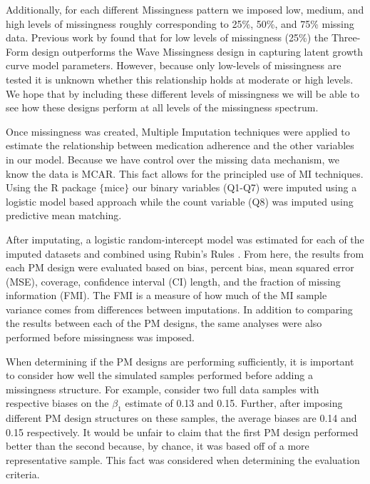 \documentclass{svjour3}\usepackage[]{graphicx}\usepackage[]{color}
\begin{document}
Additionally, for each different Missingness pattern we imposed low, medium, and high levels of missingness roughly corresponding to 25\%, 50\%, and 75\% missing data. Previous work by \citet{rhemtulla2014planned} found that for low levels of missingness (25\%) the Three-Form design outperforms the Wave Missingness design in capturing latent growth curve model parameters. However, because only low-levels of missingness are tested it is unknown whether this relationship holds at moderate or high levels. We hope that by including these different levels of missingness we will be able to see how these designs perform at all levels of the missingness spectrum. \par
Once missingness was created, Multiple Imputation techniques were applied to estimate the relationship between medication adherence and the other variables in our model. Because we have control over the missing data mechanism, we know the data is MCAR. This fact allows for the principled use of MI techniques. Using the R package $\{$mice$\}$ \citep{mice2011imputation} our binary variables (Q1-Q7) were imputed using a logistic model based approach while the count variable (Q8) was imputed using predictive mean matching. \par

After imputating, a logistic random-intercept model was estimated for each of the imputed datasets and combined using Rubin's Rules \citep{rubin2004multiple}. From here, the results from each PM design were evaluated based on bias, percent bias, mean squared error (MSE), coverage, confidence interval (CI) length, and the fraction of missing information (FMI). The FMI is a measure of how much of the MI sample variance comes from differences between imputations. In addition to comparing the results between each of the PM designs, the same analyses were also performed before missingness was imposed. \par

When determining if the PM designs are performing sufficiently, it is important to consider how well the simulated samples performed before adding a missingness structure. For example, consider two full data samples with respective biases on the $\beta_1$ estimate of 0.13 and 0.15. Further, after imposing different PM design structures on these samples, the average biases are 0.14 and 0.15 respectively. It would be unfair to claim that the first PM design performed better than the second because, by chance, it was based off of a more representative sample. This fact was considered when determining the evaluation criteria. \par
\end{document}
